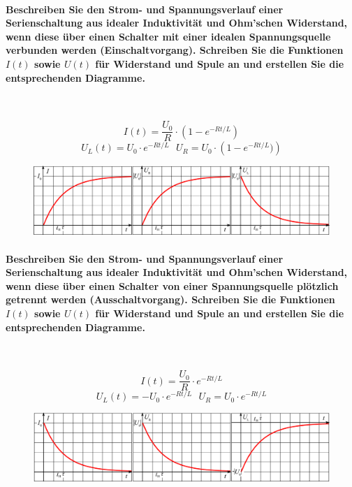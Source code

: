 \documentclass[a4paper, 11pt, ngerman, parskip=half-]{scrartcl}
\begin{document}
\paragraph{Beschreiben Sie den Strom- und Spannungsverlauf einer Serienschaltung aus idealer
    Induktivität und Ohm'schen Widerstand, wenn diese über einen Schalter mit einer idealen
    Spannungsquelle verbunden werden (Einschaltvorgang). Schreiben Sie die Funktionen $I(t)$ sowie
    $U(t)$ für Widerstand und Spule an und erstellen Sie die entsprechenden Diagramme.} ~

\begin{equation}
    I(t) = \frac{U_0}{R} \cdot \left( 1 - e^{-Rt/L} \right)
\end{equation}
\begin{equation}
    U_L(t) = U_0 \cdot e^{-Rt/L} ~~~ U_R = U_0 \cdot \left( 1 - e^{-Rt/L}) \right)
\end{equation}

\begin{figure}[H]
    \centering
    \includegraphics[width=12cm]{image/07/8}
\end{figure}

\paragraph{Beschreiben Sie den Strom- und Spannungsverlauf einer Serienschaltung aus idealer
    Induktivität und Ohm'schen Widerstand, wenn diese über einen Schalter von einer
    Spannungsquelle plötzlich getrennt werden (Ausschaltvorgang). Schreiben Sie die
    Funktionen $I(t)$ sowie $U(t)$ für Widerstand und Spule an und erstellen Sie die entsprechenden
    Diagramme.} ~

\begin{equation}
    I(t) = \frac{U_0}{R} \cdot e^{-Rt/L}
\end{equation}
\begin{equation}
    U_L(t) = - U_0 \cdot e^{-Rt/L} ~~~ U_R = U_0 \cdot e^{-Rt/L}
\end{equation}

\begin{figure}[H]
    \centering
    \includegraphics[width=12cm]{image/07/9}
\end{figure}
\end{document}
